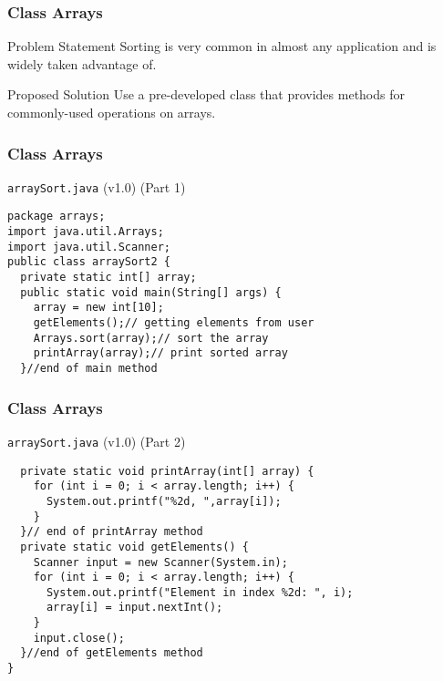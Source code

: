 \documentclass[10pt, compress]{beamer}
\begin{document}
\begin{frame}[fragile]
  \frametitle{Class Arrays}
  \begin{block}{Problem Statement}
    Sorting is very common in almost any application and is widely taken advantage of.
  \end{block}
  \begin{block}{Proposed Solution}
    Use a pre-developed class that provides methods for commonly-used operations on arrays.
  \end{block}
\end{frame}

\begin{frame}[fragile]
  \frametitle{Class Arrays}
  \begin{block}{\texttt{arraySort.java} (v1.0) (Part 1)}
    \begin{verbatim}
package arrays;
import java.util.Arrays;
import java.util.Scanner;
public class arraySort2 {
  private static int[] array;
  public static void main(String[] args) {
    array = new int[10];
    getElements();// getting elements from user
    Arrays.sort(array);// sort the array
    printArray(array);// print sorted array
  }//end of main method
    \end{verbatim}
  \end{block}
\end{frame}

\begin{frame}[fragile]
  \frametitle{Class Arrays}
  \begin{block}{\texttt{arraySort.java} (v1.0) (Part 2)}
    \begin{verbatim}
  private static void printArray(int[] array) {
    for (int i = 0; i < array.length; i++) {
      System.out.printf("%2d, ",array[i]);
    }
  }// end of printArray method
  private static void getElements() {
    Scanner input = new Scanner(System.in);
    for (int i = 0; i < array.length; i++) {
      System.out.printf("Element in index %2d: ", i);
      array[i] = input.nextInt();
    }
    input.close();
  }//end of getElements method
}
    \end{verbatim}
  \end{block}
\end{frame}
\end{document}

